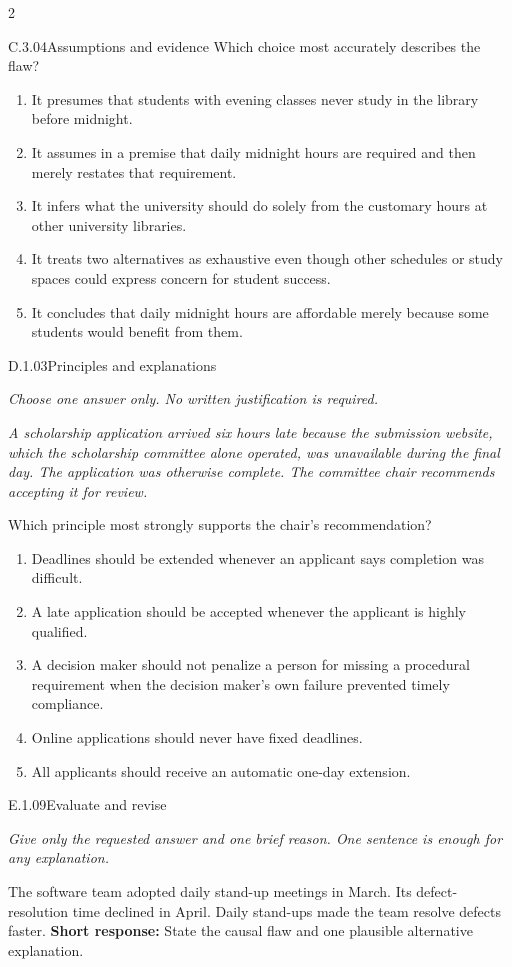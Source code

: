 \documentclass[9pt]{extarticle}
\newcommand{\choice}[1]{\item #1}
\begin{document}
\begin{multicols}{2}
\begin{DenseCoreProblem}{C.3.04}{Assumptions and evidence}
Which choice most accurately describes the flaw?
\begin{enumerate}[label=(\alph*)]
  \choice{It presumes that students with evening classes never study in the library before midnight.}
  \choice{It assumes in a premise that daily midnight hours are required and then merely restates that requirement.}
  \choice{It infers what the university should do solely from the customary hours at other university libraries.}
  \choice{It treats two alternatives as exhaustive even though other schedules or study spaces could express concern for student success.}
  \choice{It concludes that daily midnight hours are affordable merely because some students would benefit from them.}
\end{enumerate}
\end{DenseCoreProblem}
\begin{DenseCoreProblem}{D.1.03}{Principles and explanations}
{\scriptsize\textit{Choose one answer only. No written justification is required.}\par}
\emph{A scholarship application arrived six hours late because the submission website, which the scholarship committee alone operated, was unavailable during the final day. The application was otherwise complete. The committee chair recommends accepting it for review.}

Which principle most strongly supports the chair's recommendation?
\begin{enumerate}[label=(\alph*)]
  \choice{Deadlines should be extended whenever an applicant says completion was difficult.}
  \choice{A late application should be accepted whenever the applicant is highly qualified.}
  \choice{A decision maker should not penalize a person for missing a procedural requirement when the decision maker's own failure prevented timely compliance.}
  \choice{Online applications should never have fixed deadlines.}
  \choice{All applicants should receive an automatic one-day extension.}
\end{enumerate}
\end{DenseCoreProblem}
\begin{DenseCoreProblem}{E.1.09}{Evaluate and revise}
{\scriptsize\textit{Give only the requested answer and one brief reason. One sentence is enough for any explanation.}\par}
The software team adopted daily stand-up meetings in March. Its defect-resolution time declined in April. Daily stand-ups made the team resolve defects faster.
\textbf{Short response:} State the causal flaw and one plausible alternative explanation.
\end{DenseCoreProblem}
\end{multicols}
\end{document}
